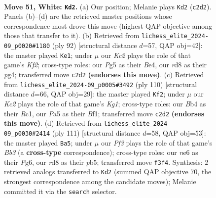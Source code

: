 \documentclass[11pt]{article}
\begin{document}
\clearpage

\begin{figure}[p]\centering
\begin{subfigure}{0.46\textwidth}\centering
\resizebox{\linewidth}{!}{%
\newchessgame
\chessboard[
  setfen={3r1b2/7p/p2pn1k1/P3p1Pp/1BP1P3/1P3P1R/2K3B1/8 w - - 3 51},
  showmover=false,
  pgfstyle=straightmove, color=movearrow, markmove={c2-d2}
]}
\caption{}
\end{subfigure}\hfill
\begin{subfigure}{0.46\textwidth}\centering
\resizebox{\linewidth}{!}{%
\newchessgame
\chessboard[
  setfen={5k2/2b2p2/2Pp1n1p/3PpP2/1B1pB1pP/3P2P1/5K2/8 w - - 4 47},
  showmover=false,
  pgfstyle=straightmove, color=movearrow, markmove={f2-e1}
]}
\caption{}
\end{subfigure}
\\[4pt]
\begin{subfigure}{0.46\textwidth}\centering
\resizebox{\linewidth}{!}{%
\newchessgame
\chessboard[
  setfen={2r5/5k2/8/1b1nP1p1/2pB1pPp/5P1P/4P3/2R2BK1 w - - 4 56},
  showmover=false,
  pgfstyle=straightmove, color=movearrow, markmove={g1-f2}
]}
\caption{}
\end{subfigure}\hfill
\begin{subfigure}{0.46\textwidth}\centering
\resizebox{\linewidth}{!}{%
\newchessgame
\chessboard[
  setfen={8/3k1p2/1b4p1/1P1bPpP1/3p1P2/3P4/pRKB3r/R7 b - - 10 56},
  showmover=false,
  pgfstyle=straightmove, color=movearrow, markmove={b6-a5}
]}
\caption{}
\end{subfigure}
\caption{\textbf{Move 51, White: \texttt{Kd2}.} (a) Our position; Melanie plays \texttt{Kd2} (\texttt{c2d2}). Panels (b)--(d) are the retrieved master positions whose correspondence most drove this move (highest QAP objective among those that transfer to it). (b) Retrieved from \texttt{lichess\_elite\_2024-09\_p0020\#1180} (ply 92) [structural distance $d$=57, QAP obj=42]: the master played \texttt{Ke1}; under $\mu$ our \emph{Kc2} plays the role of that game's \emph{Kf2}; cross-type roles: our \emph{P}g5 as their \emph{B}e4, our \emph{r}d8 as their \emph{p}g4; transferred move \texttt{c2d2} \textbf{(endorses this move)}. (c) Retrieved from \texttt{lichess\_elite\_2024-09\_p0005\#3492} (ply 110) [structural distance $d$=66, QAP obj=29]: the master played \texttt{Kf2}; under $\mu$ our \emph{Kc2} plays the role of that game's \emph{Kg1}; cross-type roles: our \emph{B}b4 as their \emph{R}c1, our \emph{P}a5 as their \emph{B}f1; transferred move \texttt{c2d2} \textbf{(endorses this move)}. (d) Retrieved from \texttt{lichess\_elite\_2024-09\_p0030\#2414} (ply 111) [structural distance $d$=58, QAP obj=53]: the master played \texttt{Ba5}; under $\mu$ our \emph{Pf3} plays the role of that game's \emph{Bb3} (a \textbf{cross-type} correspondence); cross-type roles: our \emph{n}e6 as their \emph{P}g6, our \emph{r}d8 as their \emph{p}b5; transferred move \texttt{f3f4}. Synthesis: 2 retrieved analogs transferred to \texttt{Kd2} (summed QAP objective 70, the strongest correspondence among the candidate moves); Melanie committed it via the \texttt{search} selector.}
\label{fig:thought-m100}
\end{figure}
\end{document}
